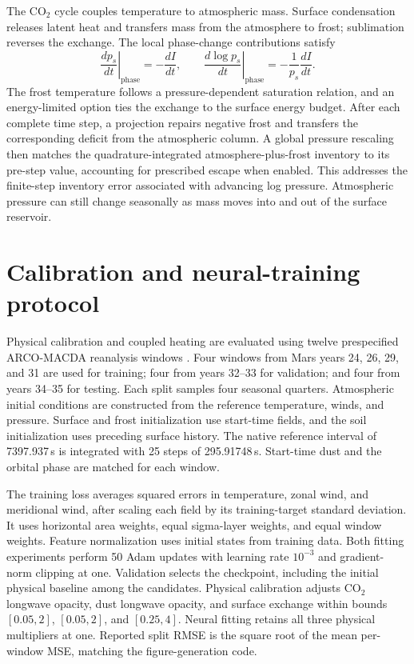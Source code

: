 \documentclass{article} %
\newcommand{\co}{CO$_2$}
\begin{document}
The \co{} cycle couples temperature to atmospheric mass. Surface condensation releases latent heat and transfers mass from the atmosphere to frost; sublimation reverses the exchange. The local phase-change contributions satisfy
\begin{equation}
 \left.\frac{dp_s}{dt}\right|_{\mathrm{phase}}=-\frac{dI}{dt},
 \qquad
 \left.\frac{d\log p_s}{dt}\right|_{\mathrm{phase}}
 =-\frac{1}{p_s}\frac{dI}{dt}.
\end{equation}
The frost temperature follows a pressure-dependent saturation relation, and an energy-limited option ties the exchange to the surface energy budget. After each complete time step, a projection repairs negative frost and transfers the corresponding deficit from the atmospheric column. A global pressure rescaling then matches the quadrature-integrated atmosphere-plus-frost inventory to its pre-step value, accounting for prescribed escape when enabled. This addresses the finite-step inventory error associated with advancing log pressure. Atmospheric pressure can still change seasonally as mass moves into and out of the surface reservoir.


\section{Calibration and neural-training protocol}\label{app:protocol}

Physical calibration and coupled heating are evaluated using twelve prespecified ARCO-MACDA reanalysis windows \citep{arcomacda,macda}. Four windows from Mars years 24, 26, 29, and 31 are used for training; four from years 32--33 for validation; and four from years 34--35 for testing. Each split samples four seasonal quarters. Atmospheric initial conditions are constructed from the reference temperature, winds, and pressure. Surface and frost initialization use start-time fields, and the soil initialization uses preceding surface history. The native reference interval of 7397.937\,s is integrated with 25 steps of 295.91748\,s. Start-time dust and the orbital phase are matched for each window.

The training loss averages squared errors in temperature, zonal wind, and meridional wind, after scaling each field by its training-target standard deviation. It uses horizontal area weights, equal sigma-layer weights, and equal window weights. Feature normalization uses initial states from training data. Both fitting experiments perform 50 Adam updates \citep{kingma2014} with learning rate $10^{-3}$ and gradient-norm clipping at one. Validation selects the checkpoint, including the initial physical baseline among the candidates. Physical calibration adjusts \co{} longwave opacity, dust longwave opacity, and surface exchange within bounds $[0.05,2]$, $[0.05,2]$, and $[0.25,4]$. Neural fitting retains all three physical multipliers at one. Reported split RMSE is the square root of the mean per-window MSE, matching the figure-generation code.
\end{document}
